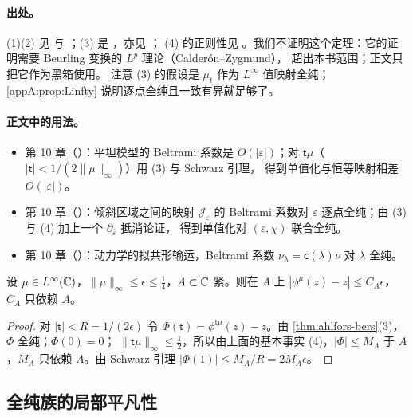 \paragraph{出处。}(1)(2) 见 \cite[第~V~章]{AhlforsLectures} 与 \cite{LehtoVirtanen}；(3) 是 \cite[定理~11]{AhlforsBers1960}，亦见 \cite[第~V~章]{AhlforsLectures}；
(4) 的正则性见 \cite[第~V~章]{AhlforsLectures}。我们不证明这个定理：它的证明需要 Beurling 变换的 $L^p$ 理论（Calderón--Zygmund），
超出本书范围；正文只把它作为黑箱使用。
注意 (3) 的假设是 $\mu_t$ 作为 $L^\infty$ 值映射全纯；\cref{appA:prop:Linfty} 说明逐点全纯且一致有界就足够了。

\paragraph{正文中的用法。}
\begin{itemize}
\item 第 10 章（\cite[引理~10.4]{KneserPaper}）：平坦模型的 Beltrami 系数是 $O(|\varepsilon|)$；对 $\mathsf t\mu$（$|\mathsf t|<1/(2\|\mu\|_\infty)$）用 (3) 与 Schwarz 引理，
  得到单值化与恒等映射相差 $O(|\varepsilon|)$。
\item 第 10 章（\cite[命题~10.9]{KneserPaper}）：倾斜区域之间的映射 $\mathcal J_\varepsilon$ 的 Beltrami 系数对 $\varepsilon$ 逐点全纯；由 (3) 与 (4) 加上一个 $\partial_{\bar\varepsilon}$ 抵消论证，
  得到单值化对 $(\varepsilon,\chi)$ 联合全纯。
\item 第 10 章（\cite[命题~10.18]{KneserPaper}）：动力学的拟共形输运，Beltrami 系数 $\nu_\lambda=\mathsf c(\lambda)\nu$ 对 $\lambda$ 全纯。
\end{itemize}

\begin{proposition}[一个标准的估计]\label{appA:prop:qc-near-id}
设 $\mu\in L^\infty(\mathbb{C})$，$\|\mu\|_\infty\le\epsilon\le\tfrac14$，$A\subset\mathbb{C}$ 紧。则在 $A$ 上 $|\phi^\mu(z)-z|\le C_A\epsilon$，$C_A$ 只依赖 $A$。
\end{proposition}

\begin{proof}
对 $|\mathsf t|<R=1/(2\epsilon)$ 令 $\Phi(\mathsf t)=\phi^{\mathsf t\mu}(z)-z$。由 \cref{thm:ahlfors-bers}(3)，$\Phi$ 全纯；$\Phi(0)=0$；
$\|\mathsf t\mu\|_\infty\le\tfrac12$，所以由上面的基本事实 (4)，$|\Phi|\le M_A$ 于 $A$，$M_A$ 只依赖 $A$。由 Schwarz 引理 $|\Phi(1)|\le M_A/R=2M_A\epsilon$。
\end{proof}

\subsection{全纯族的局部平凡性}

